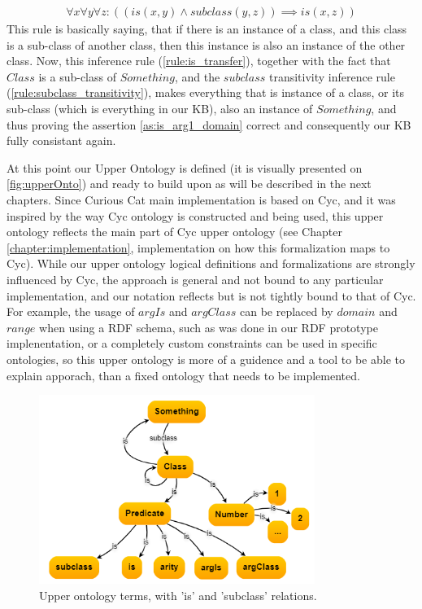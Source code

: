 \begin{equation}\label{rule:is_transfer}
\begin{gathered}
  \forall x \forall y \forall z: ((is(x,y) \land subclass(y,z)) \implies is(x,z))
\end{gathered} \end{equation}
This rule is basically saying, that if there is an instance of a class, and this
class is a sub-class of another class, then this instance is also an instance of
the other class. Now, this inference rule (\ref{rule:is_transfer}), together 
with the fact that $Class$ is a sub-class of $Something$, and the $subclass$
transitivity inference rule (\ref{rule:subclass_transitivity}), makes everything
 that is instance of a 
class, or its sub-class (which is everything in our KB), also an instance of
$Something$, and thus proving the assertion \ref{as:is_arg1_domain} correct and 
consequently our KB fully consistant again.

At this point our Upper Ontology is defined (it is visually presented on
\autoref{fig:upperOnto}) and ready to build upon as will be
described in the next chapters. Since Curious Cat main implementation is based
on Cyc, and it was inspired by the way Cyc ontology is constructed and being 
used, this upper ontology reflects the main part of Cyc upper ontology 
(see Chapter \ref{chapter:implementation}, implementation on how this 
formalization maps to Cyc). While our upper ontology logical definitions and 
formalizations are strongly influenced by Cyc, the approach is general and not 
bound to any particular implementation, and our notation reflects but is not 
tightly bound to that of Cyc. For example, the usage of $argIs$ and $argClass$
can be replaced by $domain$ and $range$ when using a RDF schema, such as was 
done in our RDF prototype implenentation\parencite{Bradesko2012a}, or a 
completely custom constraints can be used in specific ontologies, so this
upper ontology is more of a guidence and a tool to be able to explain apporach,
than a fixed ontology that needs to be implemented.

\begin{figure}[H]
	\centering
		\includegraphics[width=0.8\textwidth]{figures/upperOntology.png}
	\caption{Upper ontology terms, with 'is' and 'subclass' relations.}
	\label{fig:upperOnto}
\end{figure}

